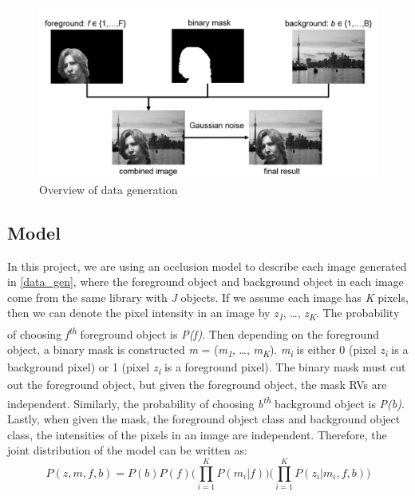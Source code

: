 \documentclass{article} %
\begin{document}
\begin{figure}[h]
\begin{center}
\includegraphics[width=1\textwidth]{data_generation}
\end{center}
\caption{Overview of data generation}
\label{fig:data_generation}
\end{figure}

\subsection{Model}
\label{model}
In this project, we are using an occlusion model to describe each image generated in \ref{data_gen}, where the foreground object and background object in each image come from the same library with \textit{J} objects. If we assume each image has \textit{K} pixels, then we can denote the pixel intensity in an image by \textit{z}\textsubscript{\textit{1}}, \ldots , \textit{z}\textsubscript{\textit{K}}. The probability of choosing \textit{f}\textsuperscript{\textit{th}} foreground object is \textit{P(f)}. Then depending on the foreground object, a binary mask is constructed \textit{m} = (\textit{m}\textsubscript{\textit{1}}, \ldots, \textit{m}\textsubscript{\textit{K}}). \textit{m}\textsubscript{\textit{i}} is either 0 (pixel \textit{z}\textsubscript{\textit{i}} is a background pixel) or 1 (pixel \textit{z}\textsubscript{\textit{i}} is a foreground pixel). The binary mask must cut out the foreground object, but given the foreground object, the mask RVs are independent. Similarly, the probability of choosing \textit{b}\textsuperscript{\textit{th}} background object is \textit{P(b)}. Lastly, when given the mask, the foreground object class and background object class, the intensities of the pixels in an image are independent. Therefore, the joint distribution of the model can be written as:
\begin{equation}
P(z,m,f,b) = P(b)P(f)\Bigg( \prod_{i=1}^KP(m_{i}|f)\Bigg)\Bigg( \prod_{i=1}^KP(z_{i}|m_{i},f,b)\Bigg)
\label{eq:eq1}
\end{equation}
\end{document}

